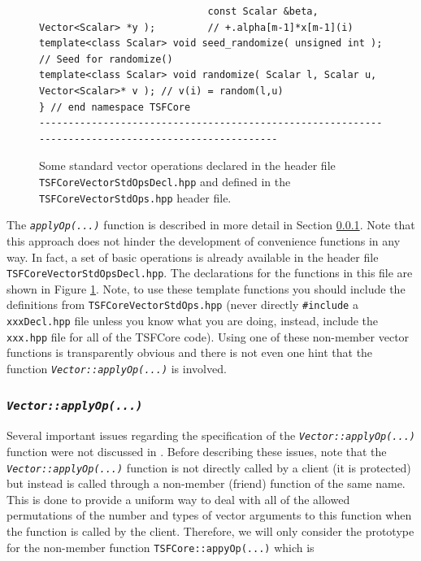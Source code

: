 {\begin{figure}[p]
\begin{minipage}{\textwidth}
{\begin{verbatim}
                             const Scalar &beta, Vector<Scalar> *y );         // +.alpha[m-1]*x[m-1](i)
template<class Scalar> void seed_randomize( unsigned int );                   // Seed for randomize()
template<class Scalar> void randomize( Scalar l, Scalar u, Vector<Scalar>* v ); // v(i) = random(l,u)
} // end namespace TSFCore
----------------------------------------------------------------------------------------------------
\end{verbatim}}
\end{minipage}
\caption{
\label{tsfcore:fig:std_vec_ops}
Some standard vector operations declared in the header file
{}\texttt{TSFCore\-Vector\-Std\-Ops\-Decl.hpp} and defined in the
{}\texttt{TSFCore\-Vector\-Std\-Ops.hpp} header file. 
}
\end{figure}
\esinglespace}

The {}\texttt{\textit{applyOp(\-...)}}  function is described in more
detail in Section {}\ref{tsfcore:sec:vec_apply_op}.  Note that this
approach does not hinder the development of convenience functions in
any way.  In fact, a set of basic operations is already available in
the header file {}\texttt{TSFCore\-Vector\-Std\-Ops\-Decl.hpp}.  The
declarations for the functions in this file are shown in Figure
{}\ref{tsfcore:fig:std_vec_ops}.  Note, to use these template
functions you should include the definitions from
{}\texttt{TSFCore\-Vector\-Std\-Ops.hpp} (never directly
{}\texttt{\#include} a {}\texttt{xxxDecl.hpp} file unless you know
what you are doing, instead, include the {}\texttt{xxx.hpp} file for
all of the TSFCore code).  Using one of these non-member vector
functions is transparently obvious and there is not even one hint that
the function {}\texttt{\textit{Vector::applyOp(\-...)}} is involved.

%
\subsubsection{\texttt{\textit{Vector::applyOp(\-...)}}}
\label{tsfcore:sec:vec_apply_op}
%

Several important issues regarding the specification of the
{}\texttt{\textit{Vector::applyOp(\-...)}} function were not discussed
in {}\cite{ref:rtop_toms}.  Before describing these issues, note that
the {}\texttt{\textit{Vector\-::applyOp(\-...)}} function is not
directly called by a client (it is protected) but instead is called
through a non-member (friend) function of the same name.  This is done
to provide a uniform way to deal with all of the allowed permutations
of the number and types of vector arguments to this function when the
function is called by the client.  Therefore, we will only consider
the prototype for the non-member function
{}\texttt{TSFCore::appyOp(...)}  which is

